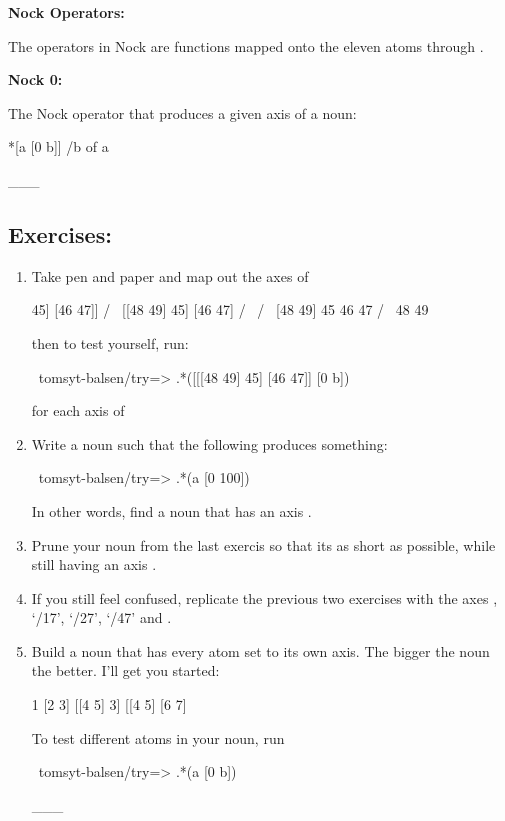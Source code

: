 \textbf{Nock Operators:}

The operators in Nock are functions mapped onto the eleven atoms  through . 

\textbf{Nock 0:}

The Nock operator that produces a given axis of a noun:
\begin{code}
*[a [0 b]]               /b of a
\end{code}
\_\_\_

\subsection{Exercises:}

\begin{enumerate}
\item Take pen and paper and map out the axes of           \newline
\begin{code}
   [[[48 49] 45] [46 47]]
       /             \
 [[48 49] 45]      [46 47]
   /       \        /   \
[48 49]    45      46   47
 /   \
48   49
\end{code}
then to test yourself, run:
\begin{code}
~tomsyt-balsen/try=> .*([[[48 49] 45] [46 47]] [0 b])
\end{code}
 for each axis  of \kode{[[[48 49] 45] [46 47]]}
\item Write a noun \kode{a} such that the following produces something:
\begin{code}
~tomsyt-balsen/try=> .*(a [0 100])
\end{code}
 In other words, find a noun that has an axis .
\item Prune your noun from the last exercis so that its as short as possible,
while still having an axis .
\item If you still feel confused, replicate the previous two exercises with the
axes \kode{/7}, `/17', `/27', `/47' and \kode{/87}.
\item Build a noun that has every atom set to its own axis. The bigger the noun
the better. I'll get you started:
\begin{code}
1
[2 3]
[[4 5] 3]
[[4 5] [6 7]
\end{code}
To test different atoms in your noun, run 
\begin{code}
~tomsyt-balsen/try=> .*(a [0 b])
\end{code}
\_\_\_
\end{enumerate}

